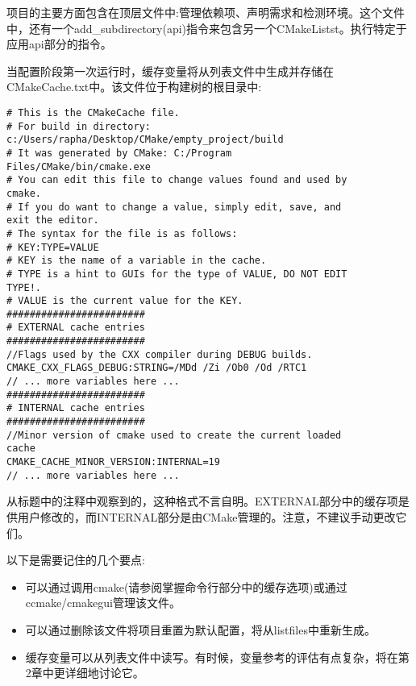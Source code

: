 项目的主要方面包含在顶层文件中:管理依赖项、声明需求和检测环境。这个文件中，还有一个add\_subdirectory(api)指令来包含另一个CMakeListst。执行特定于应用api部分的指令。


当配置阶段第一次运行时，缓存变量将从列表文件中生成并存储在CMakeCache.txt中。该文件位于构建树的根目录中:

\begin{lstlisting}[style=styleCMake]
# This is the CMakeCache file.
# For build in directory:
c:/Users/rapha/Desktop/CMake/empty_project/build
# It was generated by CMake: C:/Program
Files/CMake/bin/cmake.exe
# You can edit this file to change values found and used by
cmake.
# If you do want to change a value, simply edit, save, and
exit the editor.
# The syntax for the file is as follows:
# KEY:TYPE=VALUE
# KEY is the name of a variable in the cache.
# TYPE is a hint to GUIs for the type of VALUE, DO NOT EDIT
TYPE!.
# VALUE is the current value for the KEY.
########################
# EXTERNAL cache entries
########################
//Flags used by the CXX compiler during DEBUG builds.
CMAKE_CXX_FLAGS_DEBUG:STRING=/MDd /Zi /Ob0 /Od /RTC1
// ... more variables here ...
########################
# INTERNAL cache entries
########################
//Minor version of cmake used to create the current loaded
cache
CMAKE_CACHE_MINOR_VERSION:INTERNAL=19
// ... more variables here ...
\end{lstlisting}

从标题中的注释中观察到的，这种格式不言自明。EXTERNAL部分中的缓存项是供用户修改的，而INTERNAL部分是由CMake管理的。注意，不建议手动更改它们。

以下是需要记住的几个要点:

\begin{itemize}
\item 
可以通过调用cmake(请参阅掌握命令行部分中的缓存选项)或通过ccmake/cmakegui管理该文件。

\item 
可以通过删除该文件将项目重置为默认配置，将从listfiles中重新生成。

\item 
缓存变量可以从列表文件中读写。有时候，变量参考的评估有点复杂，将在第2章中更详细地讨论它。
\end{itemize}


